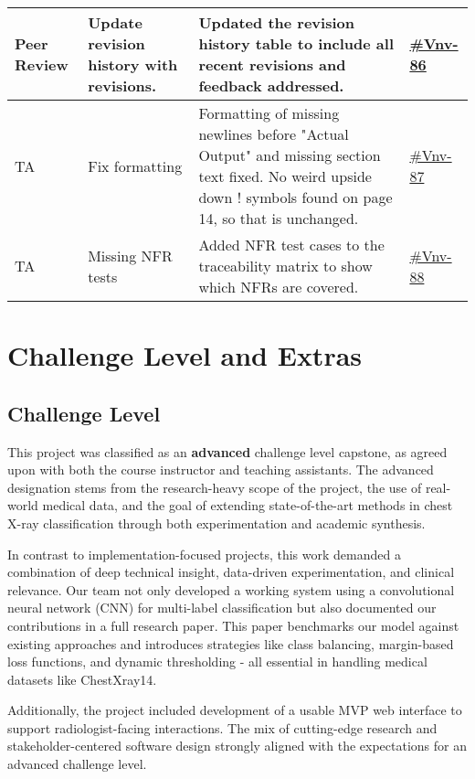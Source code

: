 \documentclass{article}
\begin{document}
\begin{longtable}{|p{1.48cm}|p{5cm}|p{4.7cm}|p{1cm}|}
Peer Review & Update revision history with revisions. & Updated the revision history table to include all recent revisions and feedback addressed. &\href{https://github.com/harrisonchiu/xray/issues/86}{\#Vnv-86}\\
\hline

TA & Fix formatting & Formatting of missing newlines before "Actual Output" and missing section text fixed. No weird upside down ! symbols found on page 14, so that is unchanged. &\href{https://github.com/harrisonchiu/xray/issues/87}{\#Vnv-87}\\
\hline

TA & Missing NFR tests & Added NFR test cases to the traceability matrix to show which NFRs are covered. &\href{https://github.com/harrisonchiu/xray/issues/88}{\#Vnv-88}\\
\hline
\end{longtable}


\section{Challenge Level and Extras}

\subsection{Challenge Level}

This project was classified as an \textbf{advanced} challenge level capstone, as agreed upon with both the course instructor and teaching assistants. The advanced designation stems from the research-heavy scope of the project, the use of real-world medical data, and the goal of extending state-of-the-art methods in chest X-ray classification through both experimentation and academic synthesis.

In contrast to implementation-focused projects, this work demanded a combination of deep technical insight, data-driven experimentation, and clinical relevance. Our team not only developed a working system using a convolutional neural network (CNN) for multi-label classification but also documented our contributions in a full research paper. This paper benchmarks our model against existing approaches and introduces strategies like class balancing, margin-based loss functions, and dynamic thresholding - all essential in handling medical datasets like ChestXray14.

Additionally, the project included development of a usable MVP web interface to support radiologist-facing interactions. The mix of cutting-edge research and stakeholder-centered software design strongly aligned with the expectations for an advanced challenge level.
\end{document}
